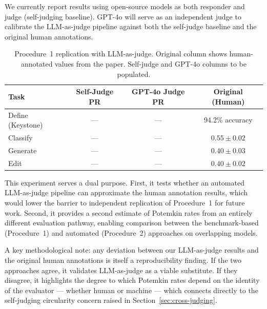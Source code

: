 \documentclass[sigconf,authordraft]{acmart}
\begin{document}
We currently report results using open-source models as both responder and judge (self-judging baseline). GPT-4o will serve as an independent judge to calibrate the LLM-as-judge pipeline against both the self-judge baseline and the original human annotations.

\begin{table}[t]
\centering
\small
\setlength{\tabcolsep}{3pt}
\renewcommand{\arraystretch}{1.15}
\begin{tabular}{l c c c}
\toprule
\textbf{Task} & \textbf{Self-Judge PR} & \textbf{GPT-4o Judge PR} & \textbf{Original (Human)} \\
\midrule
Define (Keystone)  & --- & --- & 94.2\% accuracy \\
Classify           & ---  & ---  & $0.55 \pm 0.02$ \\
Generate           & ---  & ---  & $0.40 \pm 0.03$ \\
Edit               & ---  & ---  & $0.40 \pm 0.02$ \\
\bottomrule
\end{tabular}
\caption{Procedure~1 replication with LLM-as-judge. Original column shows human-annotated values from the paper. Self-judge and GPT-4o columns to be populated.}
\label{tab:proc1-replication}
\end{table}

This experiment serves a dual purpose. First, it tests whether an automated LLM-as-judge pipeline can approximate the human annotation results, which would lower the barrier to independent replication of Procedure~1 for future work. Second, it provides a second estimate of Potemkin rates from an entirely different evaluation pathway, enabling comparison between the benchmark-based (Procedure~1) and automated (Procedure~2) approaches on overlapping models.

A key methodological note: any deviation between our LLM-as-judge results and the original human annotations is itself a reproducibility finding. If the two approaches agree, it validates LLM-as-judge as a viable substitute. If they disagree, it highlights the degree to which Potemkin rates depend on the identity of the evaluator --- whether human or machine --- which connects directly to the self-judging circularity concern raised in Section~\ref{sec:cross-judging}.

\end{document}
